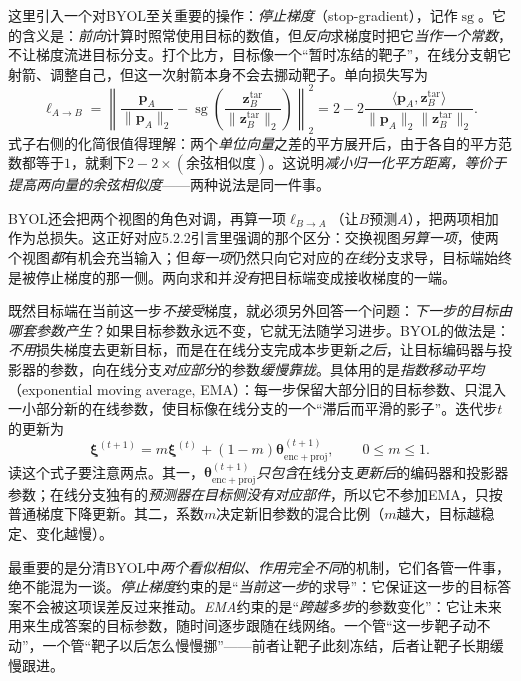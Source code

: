 这里引入一个对BYOL至关重要的操作：\emph{停止梯度}（stop-gradient），记作$\operatorname{sg}$。它的含义是：\emph{前向}计算时照常使用目标的数值，但\emph{反向}求梯度时把它\emph{当作一个常数}，不让梯度流进目标分支。打个比方，目标像一个“暂时冻结的靶子”，在线分支朝它射箭、调整自己，但这一次射箭本身不会去挪动靶子。单向损失写为
\begin{equation}
  \ell_{A\to B}
  =\left\lVert
  \frac{\bm{p}_A}{\lVert\bm{p}_A\rVert_2}
  -\operatorname{sg}\!\left(
  \frac{\bm{z}^{\mathrm{tar}}_B}{\lVert\bm{z}^{\mathrm{tar}}_B\rVert_2}
  \right)\right\rVert_2^2
  =2-2\frac{\langle\bm{p}_A,\bm{z}^{\mathrm{tar}}_B\rangle}
  {\lVert\bm{p}_A\rVert_2\lVert\bm{z}^{\mathrm{tar}}_B\rVert_2}.
  \label{eq:data-derived-knowledge-byol}
\end{equation}
式子右侧的化简很值得理解：两个\emph{单位向量}之差的平方展开后，由于各自的平方范数都等于$1$，就剩下$2-2\times(\text{余弦相似度})$。这说明\emph{减小归一化平方距离，等价于提高两向量的余弦相似度}——两种说法是同一件事。

BYOL还会把两个视图的角色对调，再算一项$\ell_{B\to A}$（让$B$预测$A$），把两项相加作为总损失。这正好对应5.2.2引言里强调的那个区分：交换视图\emph{另算一项}，使两个视图\emph{都}有机会充当输入；但\emph{每一项}仍然只向它对应的\emph{在线}分支求导，目标端始终是被停止梯度的那一侧。两向求和并\emph{没有}把目标端变成接收梯度的一端。

既然目标端在当前这一步\emph{不接受}梯度，就必须另外回答一个问题：\emph{下一步的目标由哪套参数产生}？如果目标参数永远不变，它就无法随学习进步。BYOL的做法是：\emph{不用}损失梯度去更新目标，而是在在线分支完成本步更新\emph{之后}，让目标编码器与投影器的参数，向在线分支\emph{对应部分}的参数\emph{缓慢靠拢}。具体用的是\emph{指数移动平均}（exponential moving average, EMA）：每一步保留大部分旧的目标参数、只混入一小部分新的在线参数，使目标像在线分支的一个“滞后而平滑的影子”。迭代步$t$的更新为
\begin{equation}
  \bm{\xi}^{(t+1)}
  =m\bm{\xi}^{(t)}+(1-m)\bm{\theta}_{\mathrm{enc+proj}}^{(t+1)},
  \qquad 0\leq m\leq1.
  \label{eq:data-derived-knowledge-byol-ema}
\end{equation}
读这个式子要注意两点。其一，$\bm{\theta}_{\mathrm{enc+proj}}^{(t+1)}$\emph{只包含}在线分支\emph{更新后}的编码器和投影器参数；在线分支独有的\emph{预测器在目标侧没有对应部件}，所以它不参加EMA，只按普通梯度下降更新。其二，系数$m$决定新旧参数的混合比例（$m$越大，目标越稳定、变化越慢）。

最重要的是分清BYOL中\emph{两个看似相似、作用完全不同}的机制，它们各管一件事，绝不能混为一谈。\emph{停止梯度}约束的是“\emph{当前这一步}的求导”：它保证这一步的目标答案不会被这项误差反过来推动。\emph{EMA}约束的是“\emph{跨越多步}的参数变化”：它让未来用来生成答案的目标参数，随时间逐步跟随在线网络。一个管“这一步靶子动不动”，一个管“靶子以后怎么慢慢挪”——前者让靶子此刻冻结，后者让靶子长期缓慢跟进。

